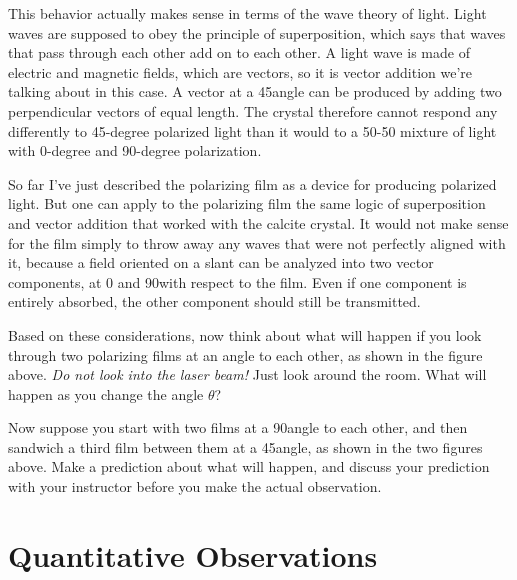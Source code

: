 This behavior actually makes sense in terms of the wave
theory of light. Light waves are supposed to obey the
principle of superposition, which says that waves that pass
through each other add on to each other. A light wave is
made of electric and magnetic fields, which are vectors, so
it is vector addition we're talking about in this case. A
vector at a 45\degunit angle can be produced by adding two
perpendicular vectors of equal length. The crystal 
therefore cannot respond any differently to 45-degree
polarized light than it would to a 50-50 mixture of  light
with 0-degree and 90-degree polarization.



So far I've just described the polarizing film as a device
for producing polarized light. But one can apply to the
polarizing film the same logic of superposition and vector
addition that worked with the calcite crystal. It would not
make sense for the film simply to throw away any waves that
were not perfectly aligned with it, because a field oriented
on a slant can be analyzed into two vector components, at 0
and 90\degunit with respect to the film. Even if one
component is entirely absorbed, the other component should
still be transmitted.


Based on these considerations, now think about what will
happen if you look through two polarizing films at an angle
to each other, as shown in the figure above. \emph{Do not look
into the laser beam!\/} Just look around the room. What will
happen as you change the angle $\theta $?




Now suppose you start with two films at a 90\degunit angle
to each other, and then sandwich a third film between them
at a 45\degunit angle, as shown in the two figures above.
Make a prediction about what will happen, and discuss your
prediction with your instructor before you make the actual observation.

\section{Quantitative Observations}

